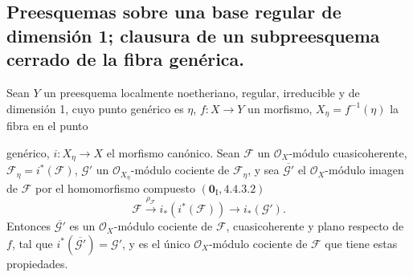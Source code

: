 \subsection{Preesquemas sobre una base regular de dimensión 1; clausura de un
subpreesquema cerrado de la fibra genérica.}
\label{subsection:IV.2.8-fr}

\begin{proposition}[2.8.1]
\label{IV.2.8.1-fr}
Sean $Y$ un preesquema localmente noetheriano, regular, irreducible y de
dimensión 1, cuyo punto genérico es $\eta$, $f:X\to Y$ un morfismo,
$X_\eta=f^{-1}(\eta)$ la fibra en el punto

genérico, $i:X_\eta\to X$ el morfismo canónico. Sean $\mathcal F$ un
$\mathcal O_X$-módulo cuasicoherente, $\mathcal F_\eta=i^*(\mathcal F)$,
$\mathcal G'$ un $\mathcal O_{X_\eta}$-módulo cociente de $\mathcal F_\eta$,
y sea $\overline{\mathcal G'}$ el $\mathcal O_X$-módulo imagen de $\mathcal F$
por el homomorfismo compuesto $(\mathbf{0}_{\mathrm I},4.4.3.2)$
\[
\mathcal F\xrightarrow{\rho_{\mathcal F}}i_*(i^*(\mathcal F))
\longrightarrow i_*(\mathcal G').
\]
Entonces $\overline{\mathcal G'}$ es un $\mathcal O_X$-módulo cociente de
$\mathcal F$, cuasicoherente y plano respecto de $f$, tal que
$i^*(\overline{\mathcal G'})=\mathcal G'$, y es el único
$\mathcal O_X$-módulo cociente de $\mathcal F$ que tiene estas propiedades.
\end{proposition}

